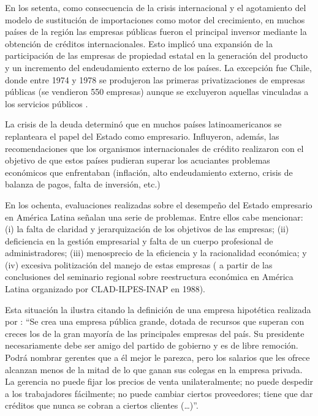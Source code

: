 \documentclass[
  12pt,
  spanish,
]{book}
\begin{document}
En los setenta, como consecuencia de la crisis internacional y el
agotamiento del modelo de sustitución de importaciones como motor del
crecimiento, en muchos países de la región las empresas públicas fueron
el principal inversor mediante la obtención de créditos internacionales.
Esto implicó una expansión de la participación de las empresas de
propiedad estatal en la generación del producto y un incremento del
endeudamiento externo de los países. La excepción fue Chile, donde entre
1974 y 1978 se produjeron las primeras privatizaciones de empresas
públicas (se vendieron 550 empresas) aunque se excluyeron aquellas
vinculadas a los servicios públicos \citep{Estache2004}.

La crisis de la deuda determinó que en muchos países latinoamericanos se
replanteara el papel del Estado como empresario. Influyeron, además, las
recomendaciones que los organismos internacionales de crédito realizaron
con el objetivo de que estos países pudieran superar los acuciantes
problemas económicos que enfrentaban (inflación, alto endeudamiento
externo, crisis de balanza de pagos, falta de inversión, etc.)

En los ochenta, evaluaciones realizadas sobre el desempeño del Estado
empresario en América Latina señalan una serie de problemas. Entre ellos
cabe mencionar: (i) la falta de claridad y jerarquización de los
objetivos de las empresas; (ii) deficiencia en la gestión empresarial y
falta de un cuerpo profesional de administradores; (iii) menosprecio de
la eficiencia y la racionalidad económica; y (iv) excesiva politización
del manejo de estas empresas (\citet{Morales1990} a partir de las
conclusiones del seminario regional sobre reestructura económica en
América Latina organizado por CLAD-ILPES-INAP en 1988).

Esta situación la ilustra citando la definición de una empresa
hipotética realizada por \citet{Kelly1985}: ``Se crea una empresa
pública grande, dotada de recursos que superan con creces los de la gran
mayoría de las principales empresas del país. Su presidente
necesariamente debe ser amigo del partido de gobierno y es de libre
remoción. Podrá nombrar gerentes que a él mejor le parezca, pero los
salarios que les ofrece alcanzan menos de la mitad de lo que ganan sus
colegas en la empresa privada. La gerencia no puede fijar los precios de
venta unilateralmente; no puede despedir a los trabajadores fácilmente;
no puede cambiar ciertos proveedores; tiene que dar créditos que nunca
se cobran a ciertos clientes (\ldots)''.
\end{document}
